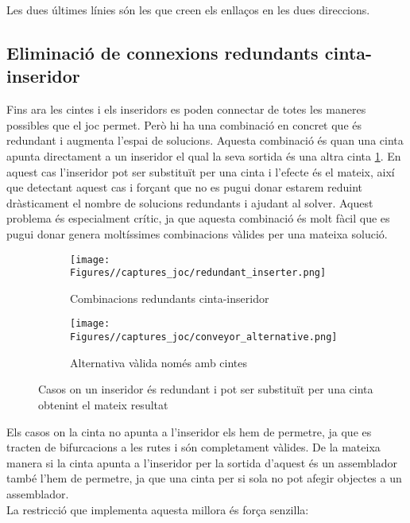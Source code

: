 Les dues últimes línies són les que creen els enllaços en les dues direccions.


\subsection{Eliminació de connexions redundants cinta-inseridor}\label{prevent-redundant-inserters}
Fins ara les cintes i els inseridors es poden connectar de totes les maneres possibles que el joc permet. Però hi ha una combinació en concret que és redundant i augmenta l'espai de solucions. Aquesta combinació és quan una cinta apunta directament a un inseridor el qual la seva sortida és una altra cinta \ref{fig:redundant_inserter}. En aquest cas l'inseridor pot ser substituït per una cinta i l'efecte és el mateix, així que detectant aquest cas i forçant que no es pugui donar estarem reduint dràsticament el nombre de solucions redundants i ajudant al solver. Aquest problema és especialment crític, ja que aquesta combinació és molt fàcil que es pugui donar genera moltíssimes combinacions vàlides per una mateixa solució.

\begin{figure}[H]
    \centering
    \begin{subfigure}{0.45\textwidth}
        \texttt{[image: Figures//captures\_joc/redundant\_inserter.png]}
        \caption{Combinacions redundants cinta-inseridor}
    \end{subfigure}
    \hfill
    \begin{subfigure}{0.45\textwidth}
        \texttt{[image: Figures//captures\_joc/conveyor\_alternative.png]}
        \caption{Alternativa vàlida només amb cintes}
    \end{subfigure}
    \caption{Casos on un inseridor és redundant i pot ser substituït per una cinta obtenint el mateix resultat}
    \label{fig:redundant_inserter}
\end{figure}

Els casos on la cinta no apunta a l'inseridor els hem de permetre, ja que es tracten de bifurcacions a les rutes i són completament vàlides. De la mateixa manera si la cinta apunta a l'inseridor per la sortida d'aquest és un assemblador també l'hem de permetre, ja que una cinta per si sola no pot afegir objectes a un assemblador.\\

La restricció que implementa aquesta millora és força senzilla:

